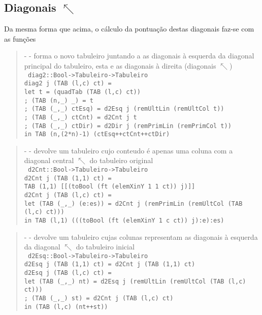 \documentclass[a4paper,titlepage]{scrreprt}
\begin{document}
		\subsection{Diagonais $\nwarrow$}
		Da mesma forma que acima, o cálculo da pontuação destas diagonais faz-se com as funções
			\begin{quote}
				{\small - - forma o novo tabuleiro juntando a as diagonais à esquerda da diagonal principal do tabuleiro, esta e as diagonais à direita (diagonais $\nwarrow$)\\}
				{\tt
				diag2::Bool->Tabuleiro->Tabuleiro\\
				diag2 j (TAB (l,c) ct) =\\
				let	t = (quadTab (TAB (l,c) ct))\\
				;	(TAB (n,\_) \_) = t\\
				;	(TAB (\_,\_) ctEsq) = d2Esq j (remUltLin (remUltCol t))\\
				;	(TAB (\_,\_) ctCnt) = d2Cnt j t\\
				;	(TAB (\_,\_) ctDir) = d2Dir j (remPrimLin (remPrimCol t))\\
				in	TAB (n,(2*n)-1) (ctEsq++ctCnt++ctDir)
				}
			\end{quote}
			\begin{quote}
				{\small - - devolve um tabuleiro cujo conteudo é apenas uma coluna com a diagonal central $\nwarrow$ do tabuleiro original\\}
				{\tt
				d2Cnt::Bool->Tabuleiro->Tabuleiro\\
				d2Cnt j (TAB (1,1) ct) =\\
				TAB (1,1) [[(toBool (ft (elemXinY 1 1 ct)) j)]]\\
				d2Cnt j (TAB (l,c) ct) =\\
				{\small let	(TAB (\_,\_) (e:es)) = d2Cnt j (remPrimLin (remUltCol (TAB (l,c) ct)))}\\
				in TAB (l,1) (((toBool (ft (elemXinY 1 c ct)) j):e):es)
				}
			\end{quote}
			\begin{quote}
				{\small - - devolve um tabuleiro cujas colunas representam as diagonais à esquerda da diagonal $\nwarrow$ do tabuleiro inicial\\}
				{\tt
				d2Esq::Bool->Tabuleiro->Tabuleiro\\
				d2Esq j (TAB (1,1) ct) = d2Cnt j (TAB (1,1) ct)\\
				d2Esq j (TAB (l,c) ct) =\\
				{\small let	(TAB (\_,\_) nt) = d2Esq j (remUltLin (remUltCol (TAB (l,c) ct)))}\\
				;	(TAB (\_,\_) st) = d2Cnt j (TAB (l,c) ct)\\
				in	(TAB (l,c) (nt++st))
				}
			\end{quote}
\end{document}
